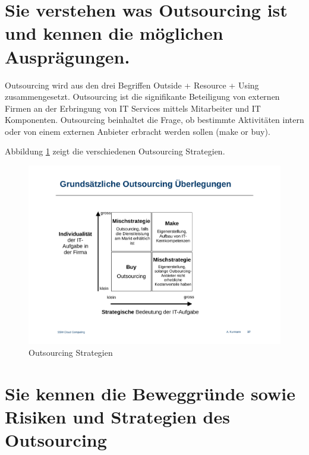 \section{Sie verstehen was Outsourcing ist und kennen die möglichen Ausprägungen.}

Outsourcing wird aus den drei Begriffen Outside + Resource + Using zusammengesetzt. Outsourcing ist die signifikante Beteiligung von externen Firmen an der Erbringung von IT Services mittels Mitarbeiter und IT Komponenten. Outsourcing beinhaltet die Frage, ob bestimmte Aktivitäten intern oder von einem externen Anbieter erbracht werden sollen (make or buy).

Abbildung \ref{fig:outsourcing-strategie} zeigt die verschiedenen Outsourcing Strategien.
\begin{figure}
	\centering
	\includegraphics[width=0.7\linewidth]{fig/outsourcing-strategie}
	\caption{Outsourcing Strategien}
	\label{fig:outsourcing-strategie}
\end{figure}

\section{Sie kennen die Beweggründe sowie Risiken und Strategien des Outsourcing}
